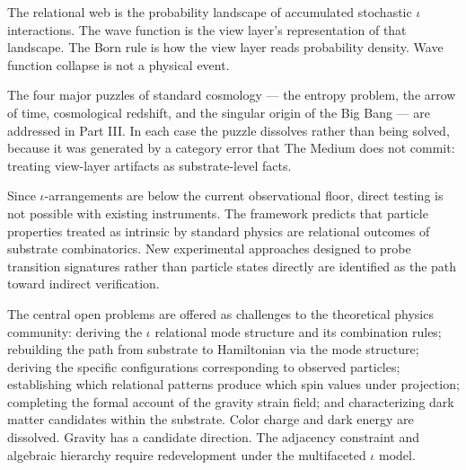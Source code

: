 \documentclass[11pt,letterpaper]{article}
\begin{document}
The relational web is the probability landscape of accumulated stochastic \(\iota\) interactions. The wave function is the view layer's representation of that landscape. The Born rule is how the view layer reads probability density. Wave function collapse is not a physical event.

The four major puzzles of standard cosmology --- the entropy problem, the arrow of time, cosmological redshift, and the singular origin of the Big Bang --- are addressed in Part III. In each case the puzzle dissolves rather than being solved, because it was generated by a category error that The Medium does not commit: treating view-layer artifacts as substrate-level facts.

Since \(\iota\)-arrangements are below the current observational floor, direct testing is not possible with existing instruments. The framework predicts that particle properties treated as intrinsic by standard physics are relational outcomes of substrate combinatorics. New experimental approaches designed to probe transition signatures rather than particle states directly are identified as the path toward indirect verification.

The central open problems are offered as challenges to the theoretical physics community: deriving the \(\iota\) relational mode structure and its combination rules; rebuilding the path from substrate to Hamiltonian via the mode structure; deriving the specific configurations corresponding to observed particles; establishing which relational patterns produce which spin values under projection; completing the formal account of the gravity strain field; and characterizing dark matter candidates within the substrate. Color charge and dark energy are dissolved. Gravity has a candidate direction. The adjacency constraint and algebraic hierarchy require redevelopment under the multifaceted \(\iota\) model.
\end{document}
